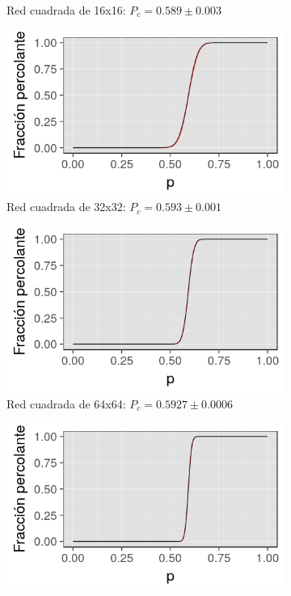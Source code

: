 \documentclass[%
 reprint,
 amsmath,amssymb,
 aps,
spanish]{revtex4-1}
\begin{document}
\begin{figure}[h]
\begin{subfigure}{.25\textwidth}
  \caption{Red cuadrada de 16x16: $P_c=0.589\pm0.003$}  
  \label{fig:1ahist}
\end{subfigure}%
\begin{subfigure}{.25\textwidth}
  \centering
  \includegraphics[width=.9\linewidth]{ej1b/32x32}
  \caption{Red cuadrada de 32x32: $P_c=0.593\pm0.001$}  
  \label{fig:1ahist}
\end{subfigure}
\begin{subfigure}{.25\textwidth}
  \centering
  \includegraphics[width=.9\linewidth]{ej1b/64x64}
  \caption{Red cuadrada de 64x64: $P_c=0.5927\pm0.0006$}  
  \label{fig:1ahist}
\end{subfigure}%
\begin{subfigure}{.25\textwidth}
  \centering
  \includegraphics[width=.9\linewidth]{ej1b/128x128}

\end{subfigure}
\end{figure}
\end{document}
